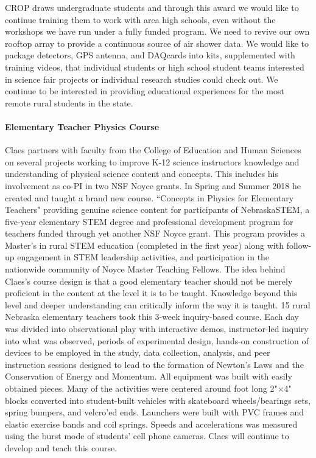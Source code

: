 CROP draws undergraduate students and through this award we would like to continue training them to work with area high schools, even without the workshops we have run under a fully funded program. We need to revive our own rooftop array to provide a continuous source of air shower data. We would like to package detectors, GPS antenna, and DAQcards into kits, supplemented with training videos, that individual students or high school student teams interested in science fair projects or individual research studies could check out.  We continue to be interested in providing educational experiences for the most remote rural students in the state. 

\paragraph{Elementary Teacher Physics Course}
Claes partners with faculty from the College of Education and Human Sciences on several projects working to improve K-12 science instructors knowledge and understanding of physical science content and concepts.  This includes his involvement as co-PI in two NSF Noyce grants. In Spring and Summer 2018 he created and taught a brand new course. ``Concepts in Physics for Elementary Teachers" providing genuine science content for participants of NebraskaSTEM, a five-year elementary STEM degree and professional development program for teachers funded through yet another NSF Noyce grant. This program provides a Master’s in rural STEM education (completed in the first year) along with follow-up engagement in STEM leadership activities, and participation in the nationwide community of Noyce Master Teaching Fellows. 
The idea behind Claes's course design is that a good elementary teacher should not be merely proficient in the content at the level it is to be taught. Knowledge beyond this level and deeper understanding can critically inform the way it is taught.
15 rural Nebraska elementary teachers took this 3-week inquiry-based course. Each day was divided into observational play with interactive demos, instructor-led inquiry into what was observed, periods of experimental design, hands-on construction of devices to be employed in the study, data collection, analysis, and peer instruction sessions designed to lead to the formation of Newton’s Laws and the Conservation of Energy and Momentum. All equipment was built with easily obtained pieces. Many of the activities were centered around foot long 2"$\times$4" blocks converted into student-built vehicles with skateboard wheels/bearings sets, spring bumpers, and velcro’ed ends. Launchers were built with PVC frames and elastic exercise bands and coil springs.  Speeds and accelerations was measured using the burst mode of students' cell phone cameras.  Claes will continue to develop and teach this course.

